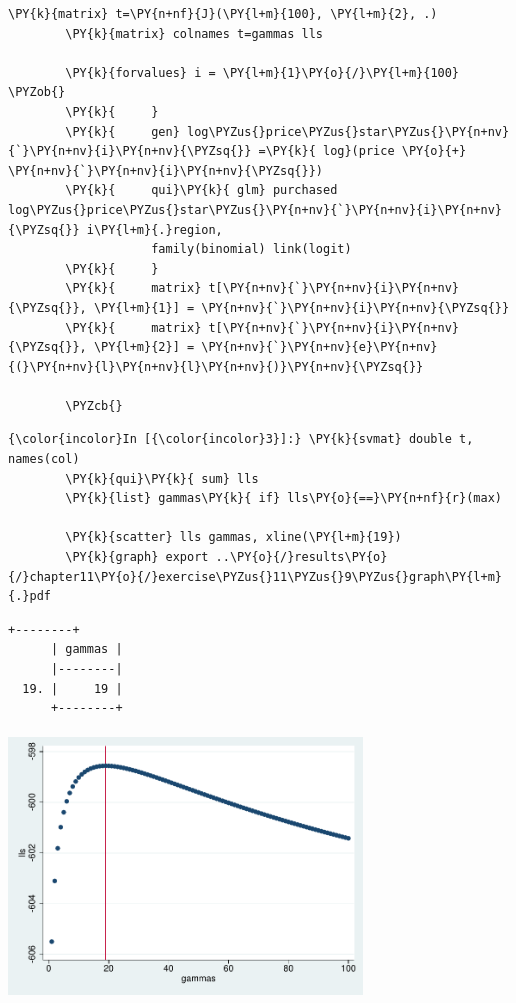 \documentclass[11pt,notitlepage]{article}\usepackage[]{graphicx}\usepackage[]{color}
\makeatletter
\newenvironment{kframe}{%
 \def\at@end@of@kframe{}%
 \ifinner\ifhmode%
  \def\at@end@of@kframe{\end{minipage}}%
  \begin{minipage}{\columnwidth}%
 \fi\fi%
 \def\FrameCommand##1{\hskip\@totalleftmargin \hskip-\fboxsep
 \colorbox{shadecolor}{##1}\hskip-\fboxsep
     \hskip-\linewidth \hskip-\@totalleftmargin \hskip\columnwidth}%
 \MakeFramed {\advance\hsize-\width
   \@totalleftmargin\z@ \linewidth\hsize
   \@setminipage}}%
 {\par\unskip\endMakeFramed%
 \at@end@of@kframe}
\newenvironment{knitrout}{}{} %
\makeatother
\begin{document}
\begin{enumerate}[a)]
\begin{knitrout}
\begin{kframe}
\begin{Verbatim}[commandchars=\\\{\}]
        \PY{k}{matrix} t=\PY{n+nf}{J}(\PY{l+m}{100}, \PY{l+m}{2}, .)
        \PY{k}{matrix} colnames t=gammas lls
            
        \PY{k}{forvalues} i = \PY{l+m}{1}\PY{o}{/}\PY{l+m}{100} \PYZob{}
        \PY{k}{		}
        \PY{k}{		gen} log\PYZus{}price\PYZus{}star\PYZus{}\PY{n+nv}{`}\PY{n+nv}{i}\PY{n+nv}{\PYZsq{}} =\PY{k}{ log}(price \PY{o}{+} \PY{n+nv}{`}\PY{n+nv}{i}\PY{n+nv}{\PYZsq{}})
        \PY{k}{		qui}\PY{k}{ glm} purchased log\PYZus{}price\PYZus{}star\PYZus{}\PY{n+nv}{`}\PY{n+nv}{i}\PY{n+nv}{\PYZsq{}} i\PY{l+m}{.}region, 
        			family(binomial) link(logit)
        \PY{k}{		}
        \PY{k}{		matrix} t[\PY{n+nv}{`}\PY{n+nv}{i}\PY{n+nv}{\PYZsq{}}, \PY{l+m}{1}] = \PY{n+nv}{`}\PY{n+nv}{i}\PY{n+nv}{\PYZsq{}}
        \PY{k}{		matrix} t[\PY{n+nv}{`}\PY{n+nv}{i}\PY{n+nv}{\PYZsq{}}, \PY{l+m}{2}] = \PY{n+nv}{`}\PY{n+nv}{e}\PY{n+nv}{(}\PY{n+nv}{l}\PY{n+nv}{l}\PY{n+nv}{)}\PY{n+nv}{\PYZsq{}}
        
        \PYZcb{}
\end{Verbatim}

    \begin{Verbatim}[commandchars=\\\{\}]
{\color{incolor}In [{\color{incolor}3}]:} \PY{k}{svmat} double t, names(col)     
        \PY{k}{qui}\PY{k}{ sum} lls
        \PY{k}{list} gammas\PY{k}{ if} lls\PY{o}{==}\PY{n+nf}{r}(max)
           
        \PY{k}{scatter} lls gammas, xline(\PY{l+m}{19})
        \PY{k}{graph} export ..\PY{o}{/}results\PY{o}{/}chapter11\PY{o}{/}exercise\PYZus{}11\PYZus{}9\PYZus{}graph\PY{l+m}{.}pdf
\end{Verbatim}

    \begin{Verbatim}[commandchars=\\\{\}]
      +--------+
      | gammas |
      |--------|
  19. |     19 |
      +--------+

    \end{Verbatim}
\end{kframe}

{\centering \includegraphics[width=3.7in,height=2.8in]{figure/PS11-unnamed-chunk-6-1} 

}
\end{knitrout}
\end{enumerate}
\end{document}
